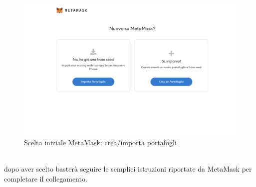 \begin{figure}[H]
    \centering
    \includegraphics[scale=0.3]{immagini/chooseMetamask.png}
    \caption{Scelta iniziale MetaMask: crea/importa portafogli}
\end{figure}

\textbf{}\\
dopo aver scelto basterà seguire le semplici istruzioni riportate da MetaMask per completare il collegamento.

